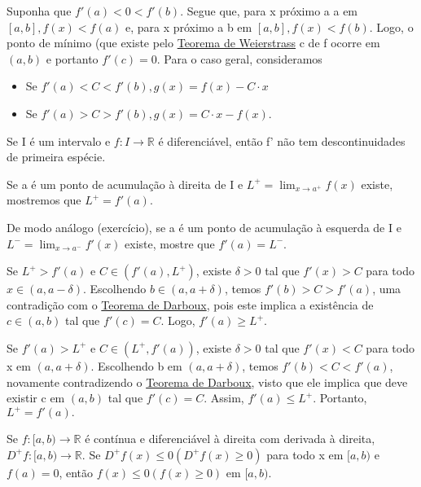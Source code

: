\documentclass[Analysis/analysis_notes.tex]{subfiles}
\begin{document}
\begin{proof*}
	Suponha que \(f'(a) < 0 < f'(b)\). Segue que, para x próximo a a em \([a, b], f(x) < f(a)\)
	e, para x próximo a b em \([a, b], f(x) < f(b).\) Logo, o ponto de mínimo (que existe pelo
	\hyperlink{weierstrass}{Teorema de Weierstrass} c de f ocorre em \((a, b)\) e
	portanto \(f'(c) = 0.\) Para o caso geral, consideramos
	\begin{itemize}
		\item Se \(f'(a) < C < f'(b), g(x) = f(x) - C \cdot x\)
		\item Se \(f'(a) > C > f'(b), g(x) = C \cdot x - f(x).\)
	\end{itemize}
\end{proof*}
\begin{theorem*}
	Se I é um intervalo e \(f:I\rightarrow \mathbb{R}\) é diferenciável, então
	f' não tem descontinuidades de primeira espécie.
\end{theorem*}
\begin{proof*}
	Se a é um ponto de acumula\c cão à direita de I e \(L^{+}=\lim_{x\to a^{+}}f(x)\)
	existe, mostremos que \(L^{+} = f'(a).\)

	De modo análogo (exercício), se a é um ponto de acumula\c cão à esquerda de I
	e \(L^{-}=\lim_{x\to a^{-}}f'(x)\) existe, mostre que \(f'(a) = L^{-}.\)

	Se \(L^{+} > f'(a)\) e \(C\in(f'(a), L^{+})\), existe \(\delta >0\) tal que
	\(f'(x) > C\) para todo \(x\in(a, a-\delta ).\) Escolhendo \(b\in(a, a+\delta )\),
	temos \(f'(b) > C > f'(a)\), uma contradi\c cão com o \hyperlink{darboux}{Teorema de Darboux},
	pois este implica a existência de \(c\in(a, b)\) tal que \(f'(c) = C.\) Logo,
	\(f'(a)\geq L^{+}.\)

	Se \(f'(a) > L^{+}\) e \(C\in(L^{+}, f'(a))\), existe \(\delta >0\) tal que
	\(f'(x) < C\) para todo x em \((a, a+\delta )\). Escolhendo b em \((a, a+\delta )\),
	temos \(f'(b) < C < f'(a)\), novamente contradizendo o \hyperlink{darboux}{Teorema de Darboux},
	visto que ele implica que deve existir c em \((a, b)\) tal que \(f'(c) = C.\) Assim,
	\(f'(a)\leq L^{+}.\) Portanto, \(L^{+} = f'(a).\) \qedsymbol
\end{proof*}
\begin{theorem*}
	Se \(f:[a, b)\rightarrow \mathbb{R}\) é contínua e diferenciável à direita com
	derivada à direita, \(D^{+}f:[a, b)\rightarrow \mathbb{R}.\) Se \(D^{+}f(x)\leq 0 (D^{+}f(x)\geq 0)\)
	para todo x em \([a, b)\) e \(f(a) = 0\), então \(f(x)\leq 0 (f(x)\geq 0)\) em \([a, b).\)
\end{theorem*}
\end{document}
